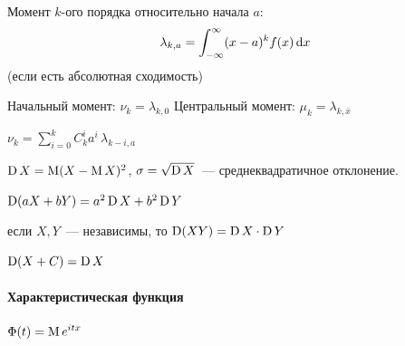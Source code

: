 \documentclass[12pt,hardcopy]{../../../notes}
\begin{document}
\begin{defn}\label{prop:prob::moments::mom}
  Момент $k$-ого порядка относительно начала $a$:
  \[
    \lambda_{k,a} = \int_{-\infty}^{\infty} (x-a)^k f(x)\, \mathrm{d} x
  \]
  (если есть абсолютная сходимость)
\end{defn}
{\label{defn:prob::moments::zer} Начальный  момент: {$\nu_k =\lambda_{k,0}$}}
{\label{defn:prob::moments::cen} Центральный  момент: {$\mu_k =\lambda_{k,\bar x}$}}

{\prop\label{prop:prob::moments::conn} $\displaystyle\nu_k=\sum_{i=0}^k C_k^i a^i \,\lambda_{k-i,a}$}

\begin{defn}[Дисперсия]\label{defn:prob::moments::var}
  $\operatorname{D} X = \operatorname{M} (X-\operatorname{M} X)^2$, $\sigma = \sqrt{\operatorname{D} X}$~--- среднеквадратичное отклонение.
\end{defn}

\begin{prop}\label{prop:prob::moments::varprop}
  \item $\operatorname{D}(a X + b Y) = a^2 \operatorname{D} X + b^2 \operatorname{D} Y$
  \item если $X,Y$~--- независимы, то $\operatorname{D} (XY) = \operatorname{D} X \cdot \operatorname{D} Y$
  \item $\operatorname{D}(X+C) = \operatorname{D} X$
\end{prop}

\paragraph{Характеристическая функция}
\label{par:prop::charfun}

\begin{defn}\label{defn:prob::moments::charfun}
  $\displaystyle \Phi(t) = \operatorname{M} e^{itx}$
\end{defn}
\end{document}
